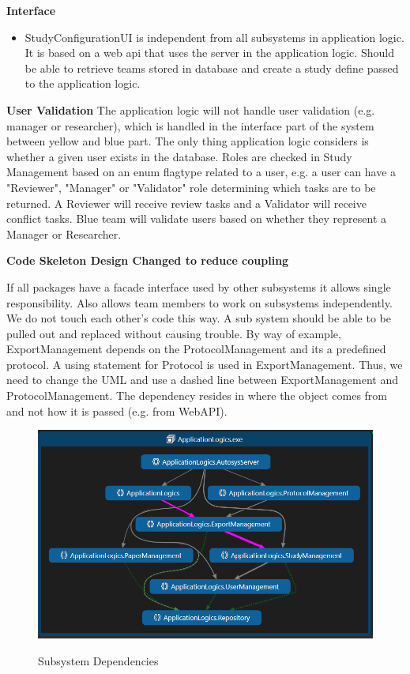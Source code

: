 \textbf{Interface}
\begin{itemize}
	\item StudyConfigurationUI is independent from all subsystems in application logic. It is based on a web api that uses the server in the application logic. Should be able to retrieve teams stored in database and create a study define passed to the application logic. 
	\end{itemize} 
	
\textbf{User Validation}
The application logic will not handle user validation (e.g. manager or researcher), which is handled in the interface part of the system between yellow and blue part. The only thing application logic considers is whether a given user exists in the database. Roles are checked in Study Management based on an enum flagtype related to a user, e.g. a user can have a "Reviewer", "Manager" or "Validator" role determining which tasks are to be returned. A Reviewer will receive review tasks and a Validator will receive conflict tasks. Blue team will validate users based on whether they represent a Manager or Researcher. 

\newpage

\textbf{Code Skeleton Design Changed to reduce coupling}

If all packages have a facade interface used by other subsystems it allows single responsibility. Also allows team members to work on subsystems independently. We do not touch each other's code this way. A sub system should be able to be pulled out and replaced without causing trouble. By way of example, ExportManagement depends on the ProtocolManagement and its a predefined protocol. A using statement for Protocol is used in ExportManagement. Thus, we need to change the UML and use a dashed line between ExportManagement and ProtocolManagement. The dependency resides in where the object comes from and not how it is passed (e.g. from WebAPI). 

\begin{figure}[H]
  \includegraphics[width = 31 em]{image/oldsubsystemdependencies}
  \label{fig:Subsystem Dependencies}
  \caption{Subsystem Dependencies}
\end{figure}

